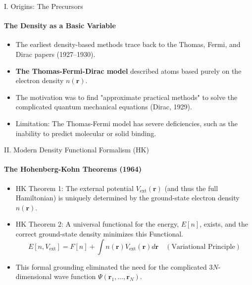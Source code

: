 \begin{frame}{\large I. Origins: The Precursors}
    \framesubtitle{The Density as a Basic Variable}
    \begin{itemize}
        \item The earliest density-based methods trace back to the Thomas, Fermi, and Dirac papers (1927–1930).
        \item \textbf{The Thomas-Fermi-Dirac model} described atoms based purely on the electron density $n(\mathbf{r})$.
        \item The motivation was to find "approximate practical methods" to solve the complicated quantum mechanical equations (Dirac, 1929).
        \item Limitation: The Thomas-Fermi model has severe deficiencies, such as the inability to predict molecular or solid binding.
    \end{itemize}
\end{frame}

\begin{frame}{\large II. Modern Density Functional Formalism (HK)}
    \framesubtitle{The Hohenberg-Kohn Theorems (1964)}
    \begin{itemize}
        \item HK Theorem 1: The external potential $V_{\text{ext}}(\mathbf{r})$ (and thus the full Hamiltonian) is uniquely determined by the ground-state electron density $n(\mathbf{r})$.
        \item HK Theorem 2: A universal functional for the energy, $E[n]$, exists, and the correct ground-state density minimizes this Functional.
        \begin{equation*}
            E[n, V_{\text{ext}}] = F[n] + \int n(\mathbf{r}) V_{\text{ext}}(\mathbf{r}) d\mathbf{r} \quad (\text{Variational Principle})
        \end{equation*}
        \item This formal grounding eliminated the need for the complicated $3N$-dimensional wave function $\Psi(\mathbf{r}_1, \ldots, \mathbf{r}_N)$.
    \end{itemize}
\end{frame}

